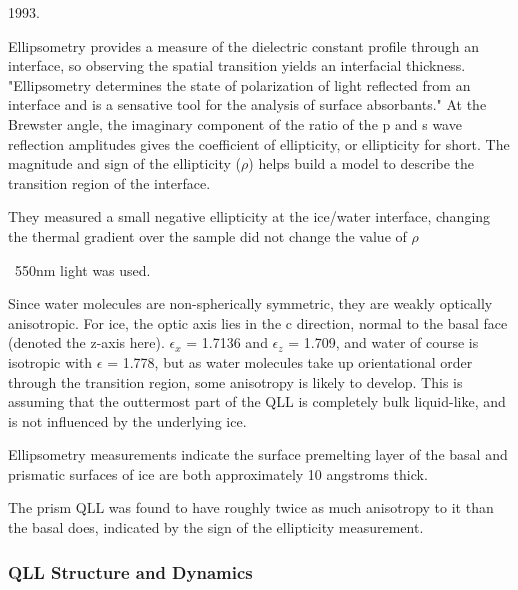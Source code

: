 %
%
1993.

Ellipsometry provides a measure of the dielectric constant profile through an interface, so observing the spatial transition yields an interfacial thickness. "Ellipsometry determines the state of polarization of light reflected from an interface and is a sensative tool for the analysis of surface absorbants." At the Brewster angle, the imaginary component of the ratio of the p and s wave reflection amplitudes gives the coefficient of ellipticity, or ellipticity for short. The magnitude and sign of the ellipticity ($\rho$) helps build a model to describe the transition region of the interface.

They measured a small negative ellipticity at the ice/water interface, changing the thermal gradient over the sample did not change the value of $\rho$  

~550nm light was used.

Since water molecules are non-spherically symmetric, they are weakly
optically anisotropic. For ice, the optic axis lies in the c
direction, normal to the basal face (denoted the z-axis
here). $\epsilon_{x}$ = 1.7136 and $\epsilon_{z}$ = 1.709, and water
of course is isotropic with $\epsilon$ = 1.778, but as water molecules
take up orientational order through the transition region, some
anisotropy is likely to develop. This is assuming that the outtermost
part of the QLL is completely bulk liquid-like, and is not influenced
by the underlying ice.

Ellipsometry measurements indicate the surface premelting layer of the basal and prismatic surfaces of ice are both approximately 10 angstroms thick.

The prism QLL was found to have roughly twice as much anisotropy to it
than the basal does, indicated by the sign of the ellipticity
measurement.
\subsubsection{QLL Structure and Dynamics}

